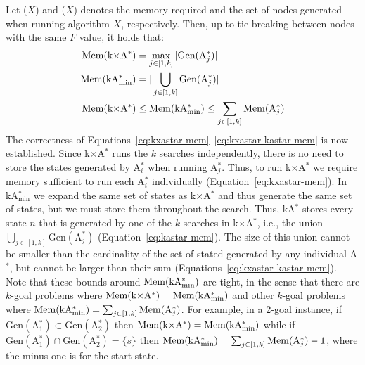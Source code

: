 \documentclass[smallextended]{svjour3}       %
\newcommand{\astar}{A$^*$\xspace}
\newcommand{\kastar}{kA$^*$\xspace}
\newcommand{\kastarvar}[1]{\textup{kA}$^*_{#1}$\xspace}
\newcommand{\kastarmin}{\kastarvar{\min}}
\newcommand{\kxastar}{k$\times$A$^*$\xspace}
\newcommand{\astari}[1]{A$^*_{#1}$\xspace}
\newcommand{\Gen}{\text{Gen}}
\newcommand{\Mem}{\text{Mem}}
\begin{document}
Let \Mem($X$) and \Gen($X$) denotes the memory required and the set of nodes generated when running algorithm $X$, respectively. Then, up to tie-breaking between nodes with the same $F$ value, it holds that:
\begin{align}
\Mem(\text{\kxastar})&=\max_{j\in [1,k]}| \Gen(\text{\astari{j}})| \label{eq:kxastar-mem}\\
\Mem(\text{\kastarmin})&=|\bigcup_{j\in [1,k]} \Gen(\text{\astari{j}})| \label{eq:kastar-mem}\\
\Mem(\text{\kxastar})&\leq \Mem(\text{\kastarmin}) \leq \sum_{j\in[1,k]} \Mem(\text{\astari{j}}) \label{eq:kxastar-kastar-mem}
\end{align}
The correctness of Equations~\eqref{eq:kxastar-mem}--\eqref{eq:kxastar-kastar-mem} is now established.
Since \kxastar runs the $k$ searches independently, there is no need to store the states generated by \astari{i} when running \astari{j}.
Thus, to run \kxastar we require memory sufficient to run each \astari{i} individually (Equation~\eqref{eq:kxastar-mem}).
In \kastarmin we expand the same set of states as \kxastar and thus generate the same set of states, but we must store them throughout the search.
Thus, \kastar stores every state $n$ that is  generated by one of the $k$ searches in \kxastar, i.e., the union $\bigcup_{j\in[1,k]}\Gen(\text{\astari{j}})$ (Equation~\eqref{eq:kastar-mem}).
The size of this union cannot be smaller than the cardinality of the set of stated generated by any individual \astar, but cannot be larger than their sum (Equations~\eqref{eq:kxastar-kastar-mem}).
Note that these bounds around $\Mem(\text{\kastarmin})$ 
are tight, in the sense that there are $k$-goal problems where $\Mem(\text{\kxastar}) = \Mem(\text{\kastarmin})$ and other $k$-goal problems where $\Mem(\text{\kastarmin}) = \sum_{j\in[1,k]} \Mem(\text{\astari{j}})$.
For example, in a 2-goal instance, if $\Gen(\text{\astari{1}})\subset \Gen(\text{\astari{2}})$ then $\Mem(\text{\kxastar}) = \Mem(\text{\kastarmin})$ while if $\Gen(\text{\astari{1}})\cap \Gen(\text{\astari{2}})=\{s\}$ then $\Mem(\text{\kastarmin}) = \sum_{j\in[1,k]} \Mem(\text{\astari{j}})-1$, where the minus one is for the start state. %
\end{document}
